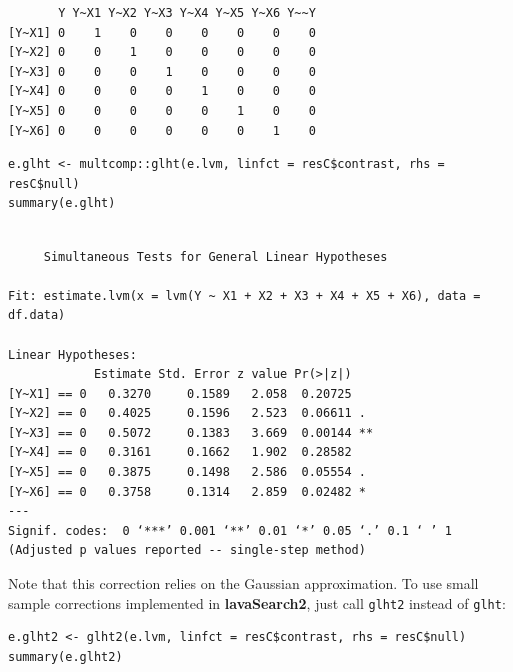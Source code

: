 \documentclass[12pt]{article}
\begin{document}
\begin{verbatim}
       Y Y~X1 Y~X2 Y~X3 Y~X4 Y~X5 Y~X6 Y~~Y
[Y~X1] 0    1    0    0    0    0    0    0
[Y~X2] 0    0    1    0    0    0    0    0
[Y~X3] 0    0    0    1    0    0    0    0
[Y~X4] 0    0    0    0    1    0    0    0
[Y~X5] 0    0    0    0    0    1    0    0
[Y~X6] 0    0    0    0    0    0    1    0
\end{verbatim}


\lstset{language=r,label= ,caption= ,captionpos=b,numbers=none}
\begin{lstlisting}
e.glht <- multcomp::glht(e.lvm, linfct = resC$contrast, rhs = resC$null)
summary(e.glht)
\end{lstlisting}

\begin{verbatim}

	 Simultaneous Tests for General Linear Hypotheses

Fit: estimate.lvm(x = lvm(Y ~ X1 + X2 + X3 + X4 + X5 + X6), data = df.data)

Linear Hypotheses:
            Estimate Std. Error z value Pr(>|z|)   
[Y~X1] == 0   0.3270     0.1589   2.058  0.20725   
[Y~X2] == 0   0.4025     0.1596   2.523  0.06611 . 
[Y~X3] == 0   0.5072     0.1383   3.669  0.00144 **
[Y~X4] == 0   0.3161     0.1662   1.902  0.28582   
[Y~X5] == 0   0.3875     0.1498   2.586  0.05554 . 
[Y~X6] == 0   0.3758     0.1314   2.859  0.02482 * 
---
Signif. codes:  0 ‘***’ 0.001 ‘**’ 0.01 ‘*’ 0.05 ‘.’ 0.1 ‘ ’ 1
(Adjusted p values reported -- single-step method)
\end{verbatim}

Note that this correction relies on the Gaussian approximation. To use
small sample corrections implemented in \textbf{lavaSearch2}, just call
\texttt{glht2} instead of \texttt{glht}:
\lstset{language=r,label= ,caption= ,captionpos=b,numbers=none}
\begin{lstlisting}
e.glht2 <- glht2(e.lvm, linfct = resC$contrast, rhs = resC$null)
summary(e.glht2)
\end{lstlisting}
\end{document}
